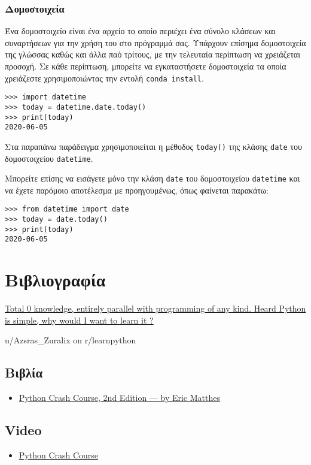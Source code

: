 \documentclass[14pt]{extreport}
\begin{document}
\subsection{Δομοστοιχεία}

Ένα δομοστοιχείο είναι ένα αρχείο το οποίο περιέχει ένα σύνολο κλάσεων  και συναρτήσεων για την χρήση του στο πρόγραμμά σας. Υπάρχουν επίσημα δομοστοιχεία της γλώσσας καθώς και άλλα παό τρίτους, με την τελευταία περίπτωση να χρειάζεται προσοχή. Σε κάθε περίπτωση, μπορείτε να εγκαταστήσετε δομοστοιχεία τα οποία χρειάζεστε χρησιμοποιώντας την εντολή \lstinline{conda install}.

\begin{lstlisting}
>>> import datetime
>>> today = datetime.date.today()
>>> print(today)
2020-06-05
\end{lstlisting}

Στα παραπάνω παράδειγμα χρησιμοποιείται η μέθοδος \lstinline{today()}  της κλάσης \lstinline{date} του δομοστοιχείου \lstinline{datetime}.

Μπορείτε επίσης να εισάγετε μόνο την κλάση \lstinline{date} του δομοστοιχείου \lstinline{datetime} και να έχετε παρόμοιο αποτέλεσμα με προηγουμένως, όπως φαίνεται παρακάτω:

\begin{lstlisting}
>>> from datetime import date
>>> today = date.today()
>>> print(today)
2020-06-05
\end{lstlisting}

\newpage

\chapter{Βιβλιογραφία}
\epigraph{\href{https://tinyurl.com/ycnad9ch}
    {Total 0 knowledge, entirely parallel with programming of any kind.
        Heard Python is simple, why would I want to learn it ?
    }
}{u/Azsras\_Zuralix on r/learnpython}
\newpage
\section{Βιβλία}
\begin{itemize}\itemsep0cm
    \item \href{https://tinyurl.com/y7l2a48c}{Python Crash Course, 2nd
              Edition — by Eric Matthes}
\end{itemize}
\section{Video}
\begin{itemize}\itemsep0cm
    \item \href{https://tinyurl.com/ya8wk4xm}{Python Crash Course}
\end{itemize}
\end{document}
